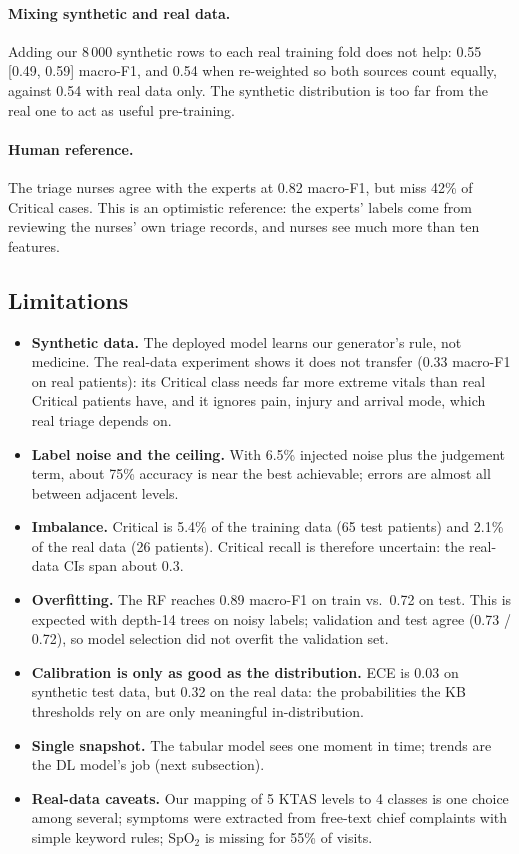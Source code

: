 \paragraph{Mixing synthetic and real data.}
Adding our 8\,000 synthetic rows to each real training fold does not help: 0.55 [0.49, 0.59] macro-F1, and 0.54
when re-weighted so both sources count equally, against 0.54 with real data only. The synthetic distribution is
too far from the real one to act as useful pre-training.

\paragraph{Human reference.}
The triage nurses agree with the experts at 0.82 macro-F1, but miss 42\% of Critical cases. This is an
optimistic reference: the experts' labels come from reviewing the nurses' own triage records, and nurses see
much more than ten features.

\subsection{Limitations}

\begin{itemize}
  \item \textbf{Synthetic data.} The deployed model learns our generator's rule, not medicine. The real-data
  experiment shows it does not transfer (0.33 macro-F1 on real patients): its Critical class needs far more
  extreme vitals than real Critical patients have, and it ignores pain, injury and arrival mode, which real
  triage depends on.
  \item \textbf{Label noise and the ceiling.} With 6.5\% injected noise plus the judgement term, about 75\%
  accuracy is near the best achievable; errors are almost all between adjacent levels.
  \item \textbf{Imbalance.} Critical is 5.4\% of the training data (65 test patients) and 2.1\% of the real
  data (26 patients). Critical recall is therefore uncertain: the real-data CIs span about 0.3.
  \item \textbf{Overfitting.} The RF reaches 0.89 macro-F1 on train vs.\ 0.72 on test. This is expected with
  depth-14 trees on noisy labels; validation and test agree (0.73 / 0.72), so model selection did not
  overfit the validation set.
  \item \textbf{Calibration is only as good as the distribution.} ECE is 0.03 on synthetic test data, but 0.32
  on the real data: the probabilities the KB thresholds rely on are only meaningful in-distribution.
  \item \textbf{Single snapshot.} The tabular model sees one moment in time; trends are the DL model's job
  (next subsection).
  \item \textbf{Real-data caveats.} Our mapping of 5 KTAS levels to 4 classes is one choice among several;
  symptoms were extracted from free-text chief complaints with simple keyword rules; SpO$_2$ is missing for
  55\% of visits.
\end{itemize}

